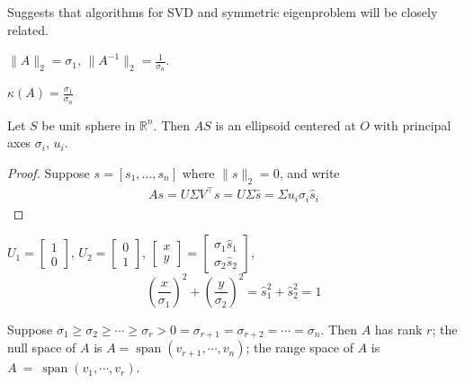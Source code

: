 \documentclass[11pt]{article}
\numberwithin{equation}{section}
\begin{document}
\begin{fact}
    Suggests that algorithms for SVD and symmetric eigenproblem will be closely related.
\end{fact}

\begin{fact}
    $\|A\|_2=\sigma_1$, $\|A^{-1} \|_{2}=\frac{1}{\sigma_{n}}$.
\end{fact}

\begin{definition}
    $\kappa(A)=\frac{\sigma_1}{\sigma_n}$
\end{definition}

\begin{fact}
    Let $S$ be unit sphere in $\mathbb{R}^n$. Then $AS$ is an ellipsoid centered at $O$ with principal axes $\sigma_i$, $u_i$.
    \begin{proof}
        Suppose $s=\left[s_{1}, \ldots, s_{n}\right]$ where $\|s\|_{2}=0$, and write
        \begin{align*}
            As=U\Sigma V^{\top}s=U\Sigma \hat{s} = \Sigma u_i \sigma_i \hat{s}_i
        \end{align*}
    \end{proof}
\end{fact}

\begin{example}
    $U_{1}=\left[\begin{array}{l}
        1 \\
        0
        \end{array}\right]$, $U_{2}=\left[\begin{array}{l}
            0 \\
            1
            \end{array}\right]$, $\left[\begin{array}{l}
                x \\
                y
                \end{array}\right]=\left[\begin{array}{l}
                \sigma_{1} \hat{s}_{1} \\
                \sigma_{2} \hat{s}_{2}
                \end{array}\right]$,
    $$\left(\frac{x}{\sigma_{1}}\right)^{2}+\left(\frac{y}{\sigma_{2}}\right)^{2}=\hat{s}_{1}^{2}+\hat{s}_{2}^{2}=1$$
\end{example}

\begin{fact}
    Suppose $\sigma_1 \geq \sigma_{2} \geq \cdots \geq \sigma_r > 0 = \sigma_{r+1}= \sigma_{r+2}= \cdots = \sigma_{n}$. Then $A$ has rank $r$;
    the null space of $A$ is $A=\operatorname{span}\left(v_{r+1}, \cdots, v_n\right)$;
    the range space of $A$ is $A\ = \ \operatorname{span}\left(v_{1}, \cdots, v_r\right)$.
\end{fact}
\end{document}
